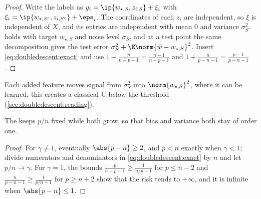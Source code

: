 \begin{refsection}
\begin{proof}
Write the labels as $y_i=\ip{w_{\star,S},z_{i,S}}+\xi_i$ with $\xi_i=\ip{w_{\star,S^c},z_{i,S^c}}+\eps_i$. The coordinates of each $z_i$ are independent, so $\xi$ is independent of $X$, and its entries are independent with mean $0$ and variance $\sigma_S^2$.  holds with target $w_{\star,S}$ and noise level $\sigma_S$, and at a test point the same decomposition gives the test error $\sigma_S^2+\E\norm{\hat w-w_{\star,S}}^2$. Insert \eqref{eq:doubledescent:exact} and use $1+\frac p{n-p-1}=\frac{n-1}{n-p-1}$ and $1+\frac n{p-n-1}=\frac{p-1}{p-n-1}$.
\end{proof}

Each added feature moves signal from $\sigma_S^2$ into $\norm{w_{\star,S}}^2$, where it can be learned; this creates a classical U below the threshold (\cref{sec:doubledescent:reading}).

The  keeps $p/n$ fixed while both grow, so that bias and variance both stay of order one.


\begin{proof}
For $\gamma\ne1$, eventually $\abs{p-n}\ge2$, and $p<n$ exactly when $\gamma<1$; divide numerators and denominators in \eqref{eq:doubledescent:exact} by $n$ and let $p/n\to\gamma$. For $\gamma=1$, the bounds $\frac p{n-p-1}\ge\frac1{n/p-1}$ for $p\le n-2$ and $\frac n{p-n-1}\ge\frac1{p/n-1}$ for $p\ge n+2$ show that the risk tends to $+\infty$, and it is infinite when $\abs{p-n}\le1$.
\end{proof}


\end{refsection}
